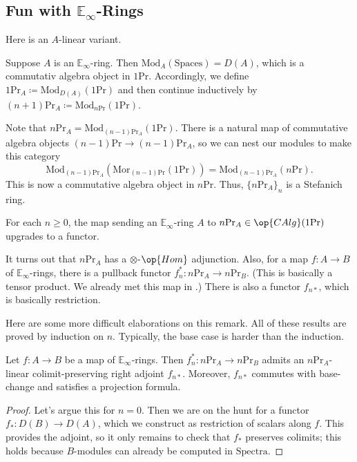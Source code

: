 \documentclass[../notes.tex]{subfiles}
\begin{document}
\subsection{Fun with \texorpdfstring{$\mathbb E_\infty$}{ Einf}-Rings}
Here is an $A$-linear variant.
\begin{example}
	Suppose $A$ is an $\mathbb E_\infty$-ring. Then $\mathrm{Mod}_A(\mathrm{Spaces})=D(A)$, which is a commutativ algebra object in $1\mathrm{Pr}$. Accordingly, we define $1\mathrm{Pr}_A\coloneqq\mathrm{Mod}_{D(A)}(1\mathrm{Pr})$ and then continue inductively by $(n+1)\mathrm{Pr}_A\coloneqq\mathrm{Mod}_{n\mathrm{Pr}}(1\mathrm{Pr})$.
\end{example}
\begin{remark} \label{rem:a-is-stefanich}
	Note that $n\mathrm{Pr}_A=\mathrm{Mod}_{(n-1)\mathrm{Pr}_A}(1\mathrm{Pr})$. There is a natural map of commutative algebra objects $(n-1)\mathrm{Pr}\to(n-1)\mathrm{Pr}_A$, so we can nest our modules to make this category
	\[\mathrm{Mod}_{(n-1)\mathrm{Pr}_A}(\mathrm{Mor}_{(n-1)\mathrm{Pr}}(1\mathrm{Pr}))=\mathrm{Mod}_{(n-1)\mathrm{Pr}_A}(n\mathrm{Pr}).\]
	This is now a commutative algebra object in $n\mathrm{Pr}$. Thus, $\{n\mathrm{Pr}_A\}_n$ is a Stefanich ring.
\end{remark}
\begin{remark}
	For each $n\ge0$, the map sending an $\mathbb E_\infty$-ring $A$ to $n\mathrm{Pr}_A\in\op{CAlg}(1\mathrm{Pr})$ upgrades to a functor.
\end{remark}
\begin{remark}
	It turns out that $n\mathrm{Pr}_A$ has a $\otimes$-$\op{Hom}$ adjunction. Also, for a map $f\colon A\to B$ of $\mathbb E_\infty$-rings, there is a pullback functor $f_n^*\colon n\mathrm{Pr}_A\to n\mathrm{Pr}_B$. (This is basically a tensor product. We already met this map in .) There is also a functor $f_{n*}$, which is basically restriction.
\end{remark}
Here are some more difficult elaborations on this remark. All of these results are proved by induction on $n$. Typically, the base case is harder than the induction.
\begin{proposition}
	Let $f\colon A\to B$ be a map of $\mathbb E_\infty$-rings. Then $f_n^*\colon n\mathrm{Pr}_A\to n\mathrm{Pr}_B$ admits an $n\mathrm{Pr}_A$-linear colimit-preserving right adjoint $f_{n*}$. Moreover, $f_{n*}$ commutes with base-change and satisfies a projection formula.
\end{proposition}
\begin{proof}
	Let's argue this for $n=0$. Then we are on the hunt for a functor $f_*\colon D(B)\to D(A)$, which we construct as restriction of scalars along $f$. This provides the adjoint, so it only remains to check that $f_*$ preserves colimits; this holds because $B$-modules can already be computed in $\mathrm{Spectra}$.
\end{proof}
\end{document}
